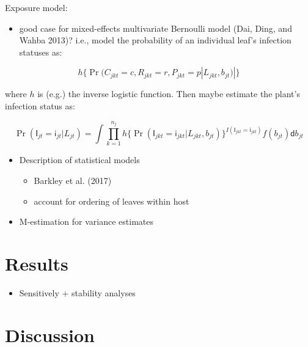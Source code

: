 \documentclass[]{article}
\providecommand{\tightlist}{%
  \setlength{\itemsep}{0pt}\setlength{\parskip}{0pt}}
\begin{document}
Exposure model:

\begin{itemize}
\tightlist
\item
  good case for mixed-effects multivariate Bernoulli model (Dai, Ding,
  and Wahba 2013)? i.e., model the probability of an individual leaf's
  infection statuses as:
\end{itemize}

\[
h\{\Pr(C_{jkt} = c, R_{jkt}  = r, P_{jkt}  = p | L_{jkt}, b_{jt})|\}
\]

where \(h\) is (e.g.) the inverse logistic function. Then maybe estimate
the plant's infection status as:

\[
\Pr(\mathsf{I}_{jt} = \mathsf{i}_{jt} | L_{jt}) = \int \prod_{k = 1}^{n_j}h\{\Pr(\mathsf{I}_{jkt} = \mathsf{i}_{jkt}  | L_{jkt}, b_{jt})\}^{I(\mathsf{I}_{jkt} = \mathsf{i}_{jkt} )} f(b_{jt}) \mathsf{d}b_{jt}
\]

\begin{itemize}
\tightlist
\item
  Description of statistical models

  \begin{itemize}
  \tightlist
  \item
    Barkley et al. (2017)
  \item
    account for ordering of leaves within host
  \end{itemize}
\item
  M-estimation for variance estimates
\end{itemize}

\hypertarget{results}{%
\section{Results}\label{results}}

\begin{itemize}
\tightlist
\item
  Sensitively + stability analyses
\end{itemize}

\hypertarget{discussion}{%
\section{Discussion}\label{discussion}}
\end{document}
